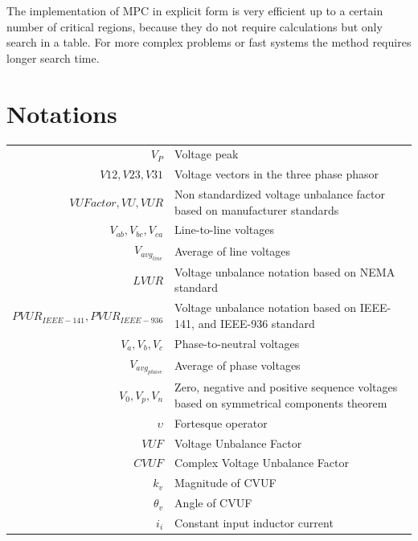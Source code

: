 The implementation of MPC in explicit form is very efficient up to a certain number of critical regions, because they do not require calculations but only search in a table. For more complex problems or fast systems the method requires longer search time.

\section{Notations}

\begin{tabularx}{\textwidth}{r|l}
	$V_P$															& Voltage peak\\
	$V12, V23, V31$										& Voltage vectors in the three phase phasor\\
  $VUFactor,VU,VUR$                	& Non standardized voltage unbalance factor based on manufacturer standards\\
	$V_{ab},V_{bc},V_{ca}$  					& Line-to-line voltages\\
	$V_{avg_{line}}$  								& Average of line voltages\\
	$LVUR$														& Voltage unbalance notation based on NEMA standard\\
	$PVUR_{IEEE-141},PVUR_{IEEE-936}$	& Voltage unbalance notation based on IEEE-141, and IEEE-936 standard\\
	$V_{a},V_{b},V_{c}$  							& Phase-to-neutral voltages\\
	$V_{avg_{phase}}$  								& Average of phase voltages\\
	$V_{0},V_{p},V_{n}$  							& Zero, negative and positive sequence voltages based on symmetrical components theorem\\
  $\upsilon$  											& Fortesque operator\\
	$VUF$  														& Voltage Unbalance Factor\\
	$CVUF$  													& Complex Voltage Unbalance Factor\\
	$k_v$  														& Magnitude of CVUF\\
	$\theta_v$  											& Angle of CVUF\\
	$i_i$															& Constant input inductor current\\

\end{tabularx}
